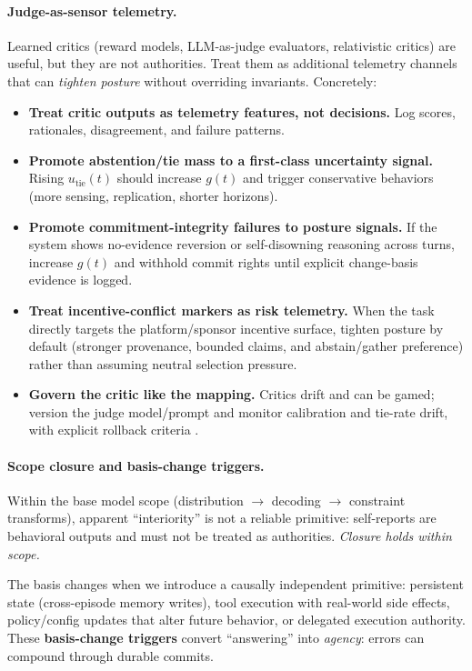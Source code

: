 \documentclass[11pt]{article}
\begin{document}
\paragraph{Judge-as-sensor telemetry.}
Learned critics (reward models, LLM-as-judge evaluators, relativistic critics) are useful, but they are not authorities. Treat them as additional telemetry channels that can \emph{tighten posture} without overriding invariants. Concretely:
\begin{itemize}
\item \textbf{Treat critic outputs as telemetry features, not decisions.} Log scores, rationales, disagreement, and failure patterns.
\item \textbf{Promote abstention/tie mass to a first-class uncertainty signal.} Rising $u_{\text{tie}}(t)$ should increase $g(t)$ and trigger conservative behaviors (more sensing, replication, shorter horizons).
\item \textbf{Promote commitment-integrity failures to posture signals.} If the system shows no-evidence reversion or self-disowning reasoning across turns, increase $g(t)$ and withhold commit rights until explicit change-basis evidence is logged.
\item \textbf{Treat incentive-conflict markers as risk telemetry.} When the task directly targets the platform/sponsor incentive surface, tighten posture by default (stronger provenance, bounded claims, and abstain/gather preference) rather than assuming neutral selection pressure.
\item \textbf{Govern the critic like the mapping.} Critics drift and can be gamed; version the judge model/prompt and monitor calibration and tie-rate drift, with explicit rollback criteria \citep{cai2025escapingverifier}.
\end{itemize}

\paragraph{Scope closure and basis-change triggers.}
Within the base model scope (distribution $\rightarrow$ decoding $\rightarrow$ constraint transforms), apparent ``interiority'' is not a reliable primitive: self-reports are behavioral outputs and must not be treated as authorities.
\emph{Closure holds within scope.}

The basis changes when we introduce a causally independent primitive: persistent state (cross-episode memory writes), tool execution with real-world side effects, policy/config updates that alter future behavior, or delegated execution authority.
These \textbf{basis-change triggers} convert ``answering'' into \emph{agency}: errors can compound through durable commits.
\end{document}
